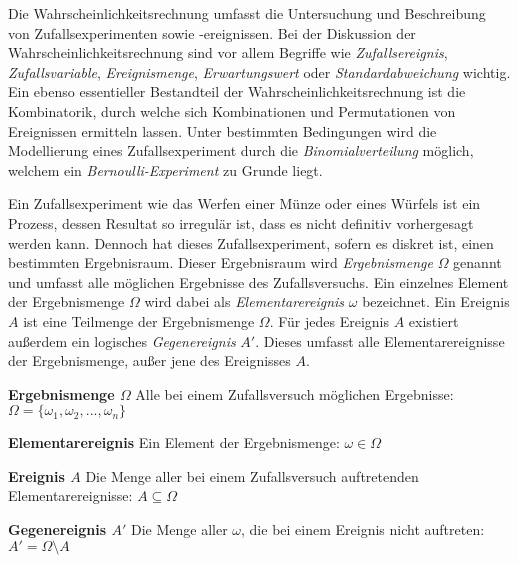 



\thispagestyle{plain}


Die Wahrscheinlichkeitsrechnung umfasst die Untersuchung und Beschreibung von Zufallsexperimenten sowie -ereignissen. Bei der Diskussion der Wahrscheinlichkeitsrechnung sind vor allem Begriffe wie \emph{Zufallsereignis}, \emph{Zufallsvariable}, \emph{Ereignismenge}, \emph{Erwartungswert} oder \emph{Standardabweichung} wichtig. Ein ebenso essentieller Bestandteil der Wahrscheinlichkeitsrechnung ist die Kombinatorik, durch welche sich Kombinationen und Permutationen von Ereignissen ermitteln lassen. Unter bestimmten Bedingungen wird die Modellierung eines Zufallsexperiment durch die \emph{Binomialverteilung} m\"{o}glich, welchem ein \emph{Bernoulli-Experiment} zu Grunde liegt. 


Ein Zufallsexperiment wie das Werfen einer M\"{u}nze oder eines W\"{u}rfels ist ein Prozess, dessen Resultat so irregul\"{a}r ist, dass es nicht definitiv vorhergesagt werden kann. Dennoch hat dieses Zufallsexperiment, sofern es diskret ist, einen bestimmten Ergebnisraum. Dieser Ergebnisraum wird \emph{Ergebnismenge} $\Omega$ genannt und umfasst alle m\"{o}glichen Ergebnisse des Zufallsversuchs. Ein einzelnes Element der Ergebnismenge $\Omega$ wird dabei als \emph{Elementarereignis} $\omega$ bezeichnet. Ein Ereignis $A$ ist eine Teilmenge der Ergebnismenge $\Omega$. F\"{u}r jedes Ereignis $A$ existiert au\ss{}erdem ein logisches \emph{Gegenereignis} $A'$. Dieses umfasst alle Elementarereignisse der Ergebnismenge, au\ss{}er jene des Ereignisses $A$. 

\textbf{Ergebnismenge $\Omega$}  Alle bei einem Zufallsversuch m\"{o}glichen Ergebnisse: $\Omega = \{ \omega_1, \omega_2, ..., \omega_n\}$

\textbf{Elementarereignis}  Ein Element der Ergebnismenge: $\omega \in \Omega$

\textbf{Ereignis $A$}  Die Menge aller bei einem Zufallsversuch auftretenden Elementarereignisse: $A \subseteq \Omega$

\textbf{Gegenereignis $A'$}  Die Menge aller $\omega$, die bei einem Ereignis nicht auftreten: $A' = \Omega \setminus A$


